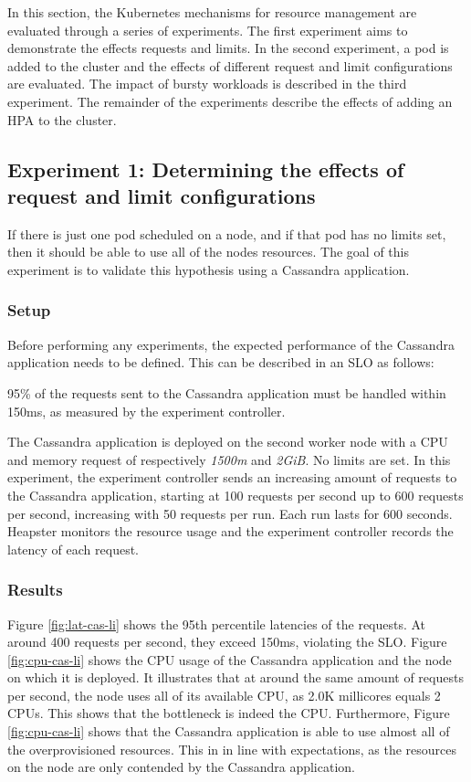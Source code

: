 In this section, the Kubernetes mechanisms for resource management are evaluated through a series of experiments. The first experiment aims to demonstrate the effects requests and limits. In the second experiment, a pod is added to the cluster and the effects of different request and limit configurations are evaluated. The impact of bursty workloads is described in the third experiment. The remainder of the experiments describe the effects of adding an HPA to the cluster.


\subsection{Experiment 1: Determining the effects of request and limit configurations}
If there is just one pod scheduled on a node, and if that pod has no limits set, then it should be able to use all of the nodes resources. The goal of this experiment is to validate this hypothesis using a  Cassandra application.

\subsubsection{Setup}
Before performing any experiments, the expected performance of the Cassandra application needs to be defined. This can be described in an SLO as follows:

\begin{slo}
95\% of the requests sent to the Cassandra application must be handled within 150ms, as measured by the experiment controller.
\end{slo}

The Cassandra application is deployed on the second worker node with a CPU and memory request of respectively \textit{1500m} and \textit{2GiB}. No limits are set. In this experiment, the experiment controller sends an increasing amount of requests to the Cassandra application, starting at 100 requests per second up to 600 requests per second, increasing with 50 requests per run. Each run lasts for 600 seconds. Heapster monitors the resource usage and the experiment controller records the latency of each request.

\subsubsection{Results}
Figure \ref{fig:lat-cas-li} shows the 95th percentile latencies of the requests. At around 400 requests per second, they exceed 150ms, violating the SLO. Figure \ref{fig:cpu-cas-li} shows the CPU usage of the Cassandra application and the node on which it is deployed. It illustrates that at around the same amount of requests per second, the node uses all of its available CPU, as 2.0K millicores equals 2 CPUs. This shows that the bottleneck is indeed the CPU. Furthermore, Figure \ref{fig:cpu-cas-li} shows that the Cassandra application is able to use almost all of the overprovisioned resources. This in in line with expectations, as the resources on the node are only contended by the Cassandra application.

